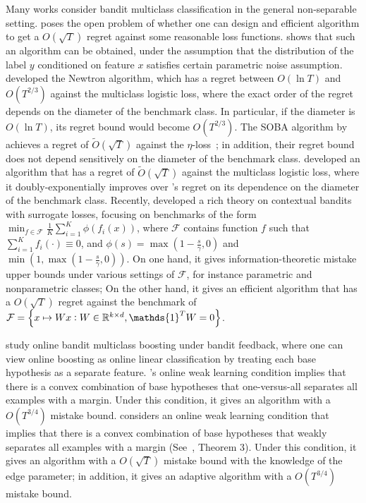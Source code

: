 \documentclass[12pt]{article}
\newcommand{\calF}{\mathcal{F}}
\newcommand{\one}{\mathds{1}}
\newcommand{\R}{\mathbb{R}}  %
\begin{document}
Many works consider bandit multiclass classification in the general non-separable setting.
\cite{Abernethy-Rakhlin-2009} poses the open problem of whether one can design
and efficient algorithm to get a $O(\sqrt{T})$ regret against some reasonable loss functions.
\cite{CrammerG13} shows that such an algorithm can be obtained, under the assumption that the distribution of the label $y$ conditioned on feature $x$ satisfies certain parametric noise assumption.
\cite{Hazan-Kale-2011} developed the Newtron algorithm, which has a regret
between $O(\ln T)$ and $O(T^{2/3})$ against the multiclass logistic loss, where the exact order of the regret depends on the diameter of the benchmark class. In particular, if the diameter is $O(\ln T)$, its regret bound would become
$O(T^{2/3})$.
The SOBA algorithm by \cite{Beygelzimer-Orabona-Zhang-2017} achieves a regret of $\tilde{O}(\sqrt{T})$ against the $\eta$-loss~\cite{Orabona-Cesa-Bianchi-Gentile-2012}; in addition, their regret bound does not depend sensitively on the diameter of the benchmark class.
\cite{Foster-Kale-Luo-Mohri-Sridharan-2018} developed an algorithm that has a regret of $\tilde{O}(\sqrt{T})$ against the multiclass logistic loss, where it doubly-exponentially improves over \cite{Hazan-Kale-2011}'s regret on its dependence on the diameter of the benchmark class.
Recently, \cite{Foster-Krishnamurthy-2018} developed a rich theory on contextual bandits with surrogate losses, focusing on benchmarks of the form $\min_{f \in \calF} \frac 1 K \sum_{i=1}^K \phi( f_i(x) )$, where $\calF$ contains function $f$ such that $\sum_{i=1}^K f_i(\cdot) \equiv 0$,
and $\phi(s) = \max(1 - \frac s \gamma, 0)$ and $\min(1, \max(1 - \frac s \gamma, 0))$.
On one hand, it gives information-theoretic mistake upper bounds under various settings of $\calF$, for instance parametric and nonparametric classes; On the other hand, it gives an efficient algorithm that has a $O(\sqrt{T})$ regret against the benchmark of $\calF = \cbr{x \mapsto W x: W \in \R^{k \times d}, \one^T W = 0}$.

\cite{Chen-Lin-Lu-2014, Zhang-Jung-Tewari-2018} study online bandit multiclass boosting under bandit feedback, where one can view online boosting as online linear classification by treating each base hypothesis as a separate feature.
\cite{Chen-Lin-Lu-2014}'s online weak learning condition implies that there is a convex combination of base hypotheses that one-versus-all separates all examples with a margin. Under this condition, it gives an algorithm with a $O(T^{3/4})$ mistake bound.
\cite{Zhang-Jung-Tewari-2018} considers an online weak learning condition that implies that there is a convex combination of base hypotheses that weakly separates all examples with a margin (See~\cite{Mukherjee-Schapire-2013}, Theorem 3). Under this condition, it gives an algorithm with a $O(\sqrt{T})$ mistake bound with the knowledge of the edge parameter; in addition, it gives an adaptive algorithm with a $O(T^{3/4})$ mistake bound.
\end{document}
